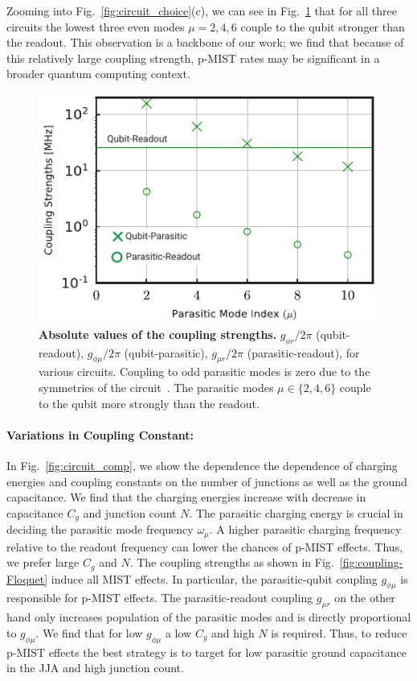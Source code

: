 \documentclass[%
reprint,
superscriptaddress,
 amsmath,amssymb,
 aps,
 prx,
longbibliography,
floatfix,
]{revtex4-2}
\begin{document}
Zooming into Fig.~\ref{fig:circuit_choice}(c), we can see in Fig.~\ref{fig:coupling-strength} that for all three circuits the lowest three even modes $\mu=2,4,6$ couple to the qubit stronger than the readout. This observation is a backbone of our work; we find that because of this relatively large coupling strength, p-MIST rates may be significant in a broader quantum computing context. %
\begin{figure}[htb]
    \centering
    \includegraphics[width=\linewidth]{Supp_Fig/Coupling-strength.pdf}
    \caption{{\bf Absolute values of the coupling strengths.} $g_{\phi r}/2\pi$ (qubit-readout), $g_{\phi\mu}/2\pi$ (qubit-parasitic), $g_{\mu r}/2\pi$ (parasitic-readout), for various circuits. Coupling to odd parasitic modes is zero due to the symmetries of the circuit~\cite{viola2015collective}. The parasitic modes $\mu\in\{2,4,6\}$ couple to the qubit more strongly than the readout.}
    \label{fig:coupling-strength}
\end{figure}

\paragraph{Variations in Coupling Constant:}
In Fig.~\ref{fig:circuit_comp}, we show the dependence the dependence of charging energies and coupling constants on the number of junctions as well as the ground capacitance. We find that the charging energies increase with decrease in capacitance $C_g$ and junction count $N$. The parasitic charging energy is crucial in deciding the parasitic mode frequency $\omega_{\mu}$. A higher parasitic charging frequency relative to the readout frequency can lower the chances of p-MIST effects. Thus, we prefer large $C_g$ and $N$. The coupling strengths as shown in Fig.~\ref{fig:coupling-Floquet} induce all MIST effects. In particular, the parasitic-qubit coupling $g_{\phi\mu}$ is responsible for p-MIST effects. The parasitic-readout coupling $g_{\mu r}$ on the other hand only increases population  of the parasitic modes and is directly proportional to $g_{\phi\mu}$. We find that for low $g_{\phi\mu}$ a low $C_g$ and high $N$ is required. Thus, to reduce p-MIST effects the best strategy is to target for low parasitic ground capacitance in the JJA and high junction count.
\end{document}

